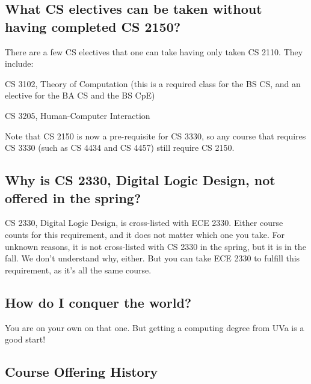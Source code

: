 \subsection{What CS electives can be taken without having completed CS
  2150?}

There are a few CS electives that one can take having only taken CS
2110.  They include:
\begin{itemlist}
\item CS 3102, Theory of Computation (this is a required class for the
  BS CS, and an elective for the BA CS and the BS CpE)
\item CS 3205, Human-Computer Interaction
\end{itemlist}

Note that CS 2150 is now a pre-requisite for CS 3330, so any course
that requires CS 3330 (such as CS 4434 and CS 4457) still require CS
2150.

\subsection{Why is CS 2330, Digital Logic Design, not offered
  in the spring?}
\label{cs2330}

CS 2330, Digital Logic Design, is cross-listed with ECE 2330.  Either
course counts for this requirement, and it does not matter which one
you take.  For unknown reasons, it is not cross-listed with CS 2330 in
the spring, but it is in the fall.  We don't understand why, either.
But you can take ECE 2330 to fulfill this requirement, as it's all the
same course.

\subsection{How do I conquer the world?}

You are on your own on that one.  But getting a computing degree from
UVa is a good start!



\label{sec:coursedesc}


\subsection{Course Offering History}

